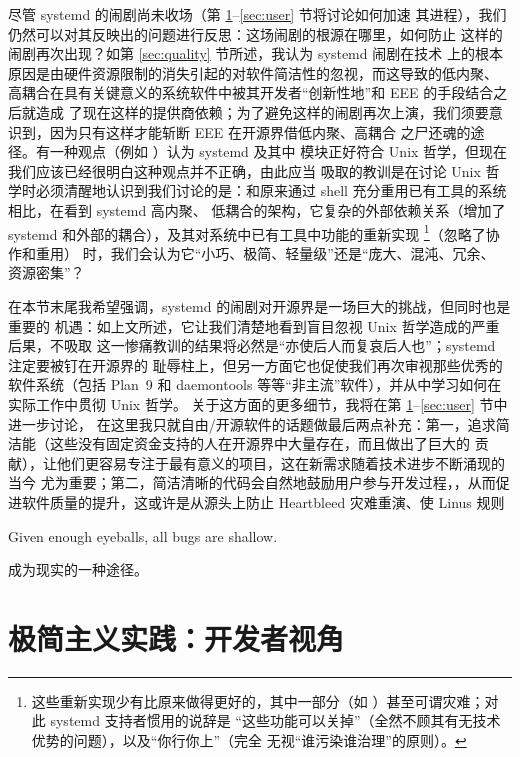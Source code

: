 尽管 systemd 的闹剧尚未收场（第 \ref{sec:devel}--\ref{sec:user} 节将讨论如何加速
其进程），我们仍然可以对其反映出的问题进行反思：这场闹剧的根源在哪里，如何防止
这样的闹剧再次出现？如第 \ref{sec:quality} 节所述，我认为 systemd 闹剧在技术
上的根本原因是由硬件资源限制的消失引起的对软件简洁性的忽视，而这导致的低内聚、
高耦合在具有关键意义的系统软件中被其开发者“创新性地”和 EEE 的手段结合之后就造成
了现在这样的提供商依赖；为了避免这样的闹剧再次上演，我们须要意识到，因为只有这样才能斩断 EEE 在开源界借低内聚、高耦合
之尸还魂的途径。有一种观点（例如 \parencite{bugaev2016}）认为 systemd 及其中
模块正好符合 Unix 哲学，但现在我们应该已经很明白这种观点并不正确，由此应当
吸取的教训是在讨论 Unix 哲学时必须清醒地认识到我们讨论的是：和原来通过 shell 充分重用已有工具的系统相比，在看到 systemd 高内聚、
低耦合的架构，它复杂的外部依赖关系（增加了 systemd
和外部的耦合），及其对系统中已有工具中功能的重新实现%
\footnote{这些重新实现少有比原来做得更好的，其中一部分（如 \parencite%
{wouters2016, david2018}）甚至可谓灾难；对此 systemd 支持者惯用的说辞是
“这些功能可以关掉”（全然不顾其有无技术优势的问题），以及“你行你上”（完全
无视“谁污染谁治理”的原则）。}（忽略了协作和重用）
时，我们会认为它“小巧、极简、轻量级”还是“庞大、混沌、冗余、
资源密集”？

在本节末尾我希望强调，systemd 的闹剧对开源界是一场巨大的挑战，但同时也是重要的
机遇：如上文所述，它让我们清楚地看到盲目忽视 Unix 哲学造成的严重后果，不吸取
这一惨痛教训的结果将必然是“亦使后人而复哀后人也”；systemd 注定要被钉在开源界的
耻辱柱上，但另一方面它也促使我们再次审视那些优秀的软件系统（包括 Plan~9 和
daemontools 等等“非主流”软件），并从中学习如何在实际工作中贯彻 Unix 哲学。
关于这方面的更多细节，我将在第 \ref{sec:devel}--\ref{sec:user} 节中进一步讨论，
在这里我只就自由/开源软件的话题做最后两点补充：第一，追求简洁能（这些没有固定资金支持的人在开源界中大量存在，而且做出了巨大的
贡献），让他们更容易专注于最有意义的项目，这在新需求随着技术进步不断涌现的当今
尤为重要；第二，简洁清晰的代码会自然地鼓励用户参与开发过程，，从而促进软件质量的提升，这或许是从源头上防止
Heartbleed 灾难重演、使 Linus 规则
\begin{quoting}
	Given enough eyeballs, all bugs are shallow.
\end{quoting}
成为现实的一种途径。

\section{极简主义实践：开发者视角}\label{sec:devel}

